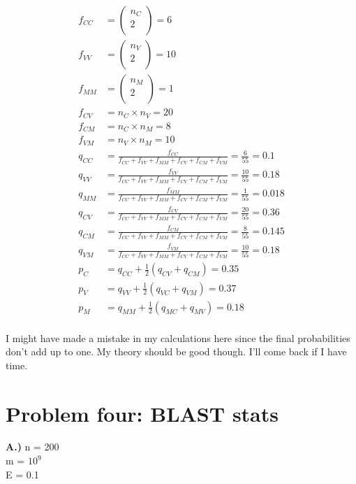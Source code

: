 \documentclass[10pt]{article} %
\begin{document}
\begin{align*}
  f_{CC} &= \begin{pmatrix} n_C\\ 2\\ \end{pmatrix} = 6\\
  f_{VV} &= \begin{pmatrix} n_V\\ 2\\ \end{pmatrix} = 10\\
  f_{MM} &= \begin{pmatrix} n_M\\ 2\\ \end{pmatrix} = 1\\
  f_{CV} &= n_C \times n_V = 20\\
  f_{CM} &= n_C \times n_M = 8\\
  f_{VM} &= n_V \times n_M = 10\\
  q_{CC} &= \frac{f_{CC}}{f_{CC} + f_{VV} + f_{MM} + f_{CV} + f_{CM} + f_{VM}}
  = \frac{6}{55} = 0.1\\
  q_{VV} &= \frac{f_{VV}}{f_{CC} + f_{VV} + f_{MM} + f_{CV} + f_{CM} + f_{VM}}
  = \frac{10}{55} = 0.18\\
  q_{MM} &= \frac{f_{MM}}{f_{CC} + f_{VV} + f_{MM} + f_{CV} + f_{CM} + f_{VM}}
  = \frac{1}{55} = 0.018\\
  q_{CV} &= \frac{f_{CV}}{f_{CC} + f_{VV} + f_{MM} + f_{CV} + f_{CM} + f_{VM}}
  = \frac{20}{55} = 0.36\\
  q_{CM} &= \frac{f_{CM}}{f_{CC} + f_{VV} + f_{MM} + f_{CV} + f_{CM} + f_{VM}}
  = \frac{8}{55} = 0.145\\
  q_{VM} &= \frac{f_{VM}}{f_{CC} + f_{VV} + f_{MM} + f_{CV} + f_{CM} + f_{VM}}
  = \frac{10}{55} = 0.18\\
  p_C &= q_{CC} + \frac{1}{2}\left(q_{CV} + q_{CM}\right) = 0.35\\
  p_V &= q_{VV} + \frac{1}{2}\left(q_{VC} + q_{VM}\right) = 0.37\\
  p_M &= q_{MM} + \frac{1}{2}\left(q_{MC} + q_{MV}\right) = 0.18\\
\end{align*}

I might have made a mistake in my calculations here since the final probabilities
don't add up to one. My theory should be good though. I'll come back if I have time.\\

\section{Problem four: BLAST stats}
\textbf{A.)}
n = 200\\
m = $10^9$\\
E = 0.1\\
\end{document}
